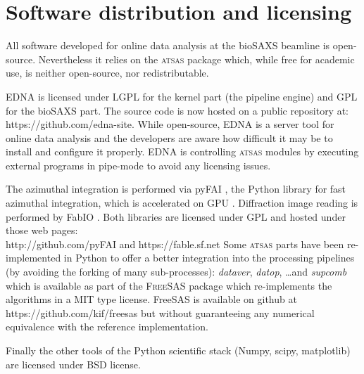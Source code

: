 \documentclass[preprint,pdf]{iucr}              %
\begin{document}
\section{Software distribution and licensing}

All software developed for online data analysis at the bioSAXS beamline is
open-source.
Nevertheless it relies on the \textsc{atsas} package which, while free for
academic use, is neither open-source, nor redistributable.

EDNA is licensed under LGPL for the kernel part (the pipeline engine) and GPL
for the bioSAXS part. The source code is now hosted on a public
repository at:\\https://github.com/edna-site.
While open-source, EDNA is a
server tool for online data analysis and the developers are aware how difficult
it may be to install and configure it properly. EDNA is controlling
\textsc{atsas} modules by executing external programs in pipe-mode to avoid any
licensing issues.

The azimuthal integration is performed via pyFAI \cite{pyFAI}, the Python library
for fast azimuthal integration, which is accelerated on GPU \cite{pyFAI_2015}.
Diffraction image reading is performed by FabIO \cite{fabio}.
Both libraries
are licensed under GPL and hosted under those web pages:\\
http://github.com/pyFAI and https://fable.sf.net
Some \textsc{atsas} parts have been re-implemented in Python to offer a better
integration into the processing pipelines (by avoiding the forking of many
sub-processes): \textit{dataver}, \textit{datop}, \ldots  and
\textit{supcomb} which is available as part of the \textsc{FreeSAS} package
which re-implements the algorithms in a MIT type license. FreeSAS is available
on github at https://github.com/kif/freesas but without guaranteeing any
numerical equivalence with the reference implementation.

Finally the other tools of the Python scientific stack (Numpy, scipy,
matplotlib) are licensed under BSD license.
\end{document}

